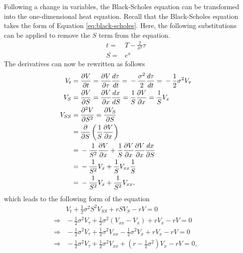 Following a change in variables, the Black-Scholes equation can be transformed into the one-dimensional heat equation. Recall that the Black-Scholes equation takes the form of Equation \eqref{eq:black-scholes}.
Here, the following substitutions can be applied to remove the $S$ term from the equation.
\begin{subequations}
\begin{align} 
t ={}& T - \frac{2}{\sigma^2} \tau\\
S ={}& e^x 
\end{align} 
\end{subequations}
The derivatives can now be rewritten as follows
\begin{align}
    V_t 
{}={}& 
    \frac{\partial V}{\partial t} 
    {}={} 
    \frac{\partial V}{\partial \tau} \frac{d \tau}{dt} 
    {}={} 
    -\frac{\sigma^2}{2} \frac{d \tau}{dt} 
    {}={}  -\frac{1}{2} \sigma^2 V_{\tau}
\\
    V_S
{}={}& 
    \frac{\partial V}{\partial S} 
    {}={} 
    \frac{\partial V}{\partial x} \frac{dx}{dS} 
    {}={} 
    \frac{1}{S} \frac{\partial V}{\partial x} 
    {}={}
    \frac{1}{S} V_x
\\
    V_{SS} 
{}={}& 
    \frac{\partial^2 V}{\partial S^2} 
    {}={} 
    \frac{\partial V_S}{\partial S} 
\notag\\
{}={}& 
    \frac{\partial}{\partial S} \left( \frac{1}{S} \frac{\partial V}{\partial x} \right) 
\notag\\
{}={}& 
    -\frac{1}{S^2} \frac{\partial V}{\partial x} + \frac{1}{S} \frac{\partial V}{\partial x} \frac{\partial V}{\partial x} \frac{dx}{\partial S} 
\notag\\
{}={}& 
    -\frac{1}{S^2} V_x + \frac{1}{S} V_{xx} \frac{1}{S} 
\notag\\
{}={}& 
    -\frac{1}{S^2} V_x + \frac{1}{S^2} V_{xx},
\end{align}
which leads to the following form of the equation
\begin{equation}
\begin{aligned}
& V_t + \frac{1}{2}\sigma^2 S^2 V_{SS} + rSV_S - rV =  0
\\
\Rightarrow{}&{}  -\frac{1}{2}\sigma^2 V_{\tau} + \frac{1}{2} \sigma^2 (V_{xx} - V_x) + rV_x - rV = 0
\\
\Rightarrow{}&{} -\frac{1}{2}\sigma^2 V_{\tau} + \frac{1}{2} \sigma^2 V_{xx} -\frac{1}{2}\sigma^2 V_x + rV_x - rV = 0
\\
\Rightarrow{}&{} -\frac{1}{2}\sigma^2 V_{\tau} + \frac{1}{2} \sigma^2 V_{xx} + (r - \frac{1}{2}\sigma^2)V_x - rV = 0,
\end{aligned}
\end{equation}
